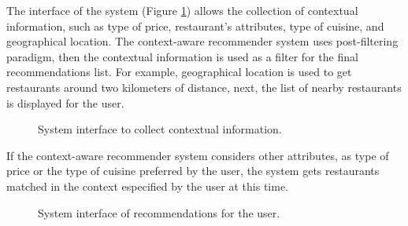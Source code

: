 The interface of the system (Figure  \ref{fig:context}) allows the collection 
of contextual information, such as type of price, restaurant's
attributes, type of cuisine, and geographical location. 
The context-aware recommender system uses post-filtering paradigm, 
then the contextual information is used as a filter for the final 
recommendations list. For example, geographical location is used 
to get restaurants around two kilometers of distance, next, 
the list of nearby restaurants is displayed for the user.\\  
\begin{figure}
\captionsetup{justification=centering,margin=2cm,font=footnotesize}
\centering
{}
\caption{System interface to collect contextual information.}
\label{fig:context}   
\end{figure}
If the context-aware recommender system
considers other attributes, as type of price or the type of cuisine
preferred by the user, the system gets restaurants matched in the
context especified by the user at this time. 
\begin{figure}
\captionsetup{font=footnotesize}
\centering
{}
\caption{System interface of recommendations for the user.}
\label{fig:recom}    
\end{figure}
